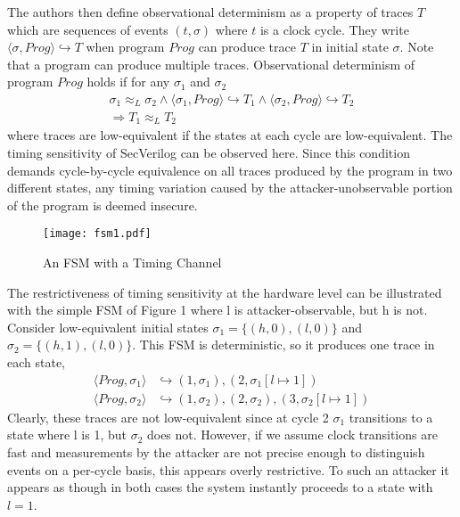 \documentclass[paper=a4, fontsize=10pt]{scrartcl} %
\begin{document}
The authors then define observational determinism as a property of traces $T$ 
which are sequences of events $(t,\sigma)$ where $t$ is a clock cycle. They 
write $\langle \sigma, Prog\rangle \hookrightarrow T$ when program $Prog$ can 
produce trace $T$ in initial state $\sigma$. Note that a program can produce 
multiple traces. Observational determinism of program $Prog$ holds if for any 
$\sigma_1$ and $\sigma_2$
\begin{align}
    \sigma_1 \approx_L \sigma_2 \wedge \langle\sigma_1,Prog\rangle 
    \hookrightarrow T_1
    \wedge \langle\sigma_2,Prog\rangle \hookrightarrow T_2 \\
    \Longrightarrow T_1 \approx_L T_2
\end{align}
where traces are low-equivalent if the states at each cycle are low-equivalent.
The timing sensitivity of SecVerilog can be observed here. Since this condition 
demands cycle-by-cycle equivalence on all traces produced by the program in two 
different states, any timing variation caused by the attacker-unobservable 
portion of the program is deemed insecure.

\begin{figure}
    \begin{center}
        \texttt{[image: fsm1.pdf]}
        \caption{An FSM with a Timing Channel}
        \label{fig:fsm1}
    \end{center}
\end{figure}

The restrictiveness of timing sensitivity at the hardware level can be 
illustrated with the simple FSM of Figure 1 where l is attacker-observable, but 
h is not. Consider low-equivalent initial states $\sigma_1=\{(h,0),(l,0)\}$ and
$\sigma_2=\{(h,1),(l,0)\}$. This FSM is deterministic, so it produces one trace 
in each state,
\begin{align*}
\langle Prog, \sigma_1 \rangle &\hookrightarrow
(1, \sigma_1), (2, \sigma_1[l\mapsto1]) \\
\langle Prog, \sigma_2 \rangle &\hookrightarrow
(1, \sigma_2), (2, \sigma_2), (3, \sigma_2[l\mapsto1])
\end{align*}
Clearly, these traces are not low-equivalent since at cycle 2 $\sigma_1$ 
transitions to a state where l is 1, but $\sigma_2$ does not. However, if we 
assume clock transitions are fast and measurements by the attacker are not 
precise enough to distinguish events on a per-cycle basis, this appears overly 
restrictive. To such an attacker it appears as though in both cases the system 
instantly proceeds to a state with $l=1$.
\end{document}
